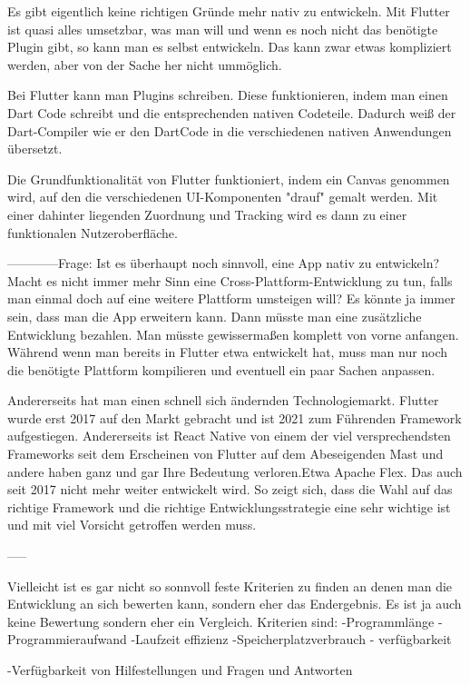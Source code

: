 Es gibt eigentlich keine richtigen Gründe mehr nativ zu entwickeln. Mit Flutter ist quasi alles umsetzbar, was man will und wenn es noch nicht das benötigte Plugin gibt, so kann man es selbst entwickeln. Das kann zwar etwas kompliziert werden, aber von der Sache her nicht ummöglich.

Bei Flutter kann man Plugins schreiben. Diese funktionieren, indem man einen Dart Code schreibt und die entsprechenden nativen Codeteile. Dadurch weiß der Dart-Compiler wie er den DartCode in die verschiedenen nativen Anwendungen übersetzt.

Die Grundfunktionalität von Flutter funktioniert, indem ein Canvas genommen wird, auf den die verschiedenen UI-Komponenten "drauf" gemalt werden. Mit einer dahinter liegenden Zuordnung und Tracking wird es dann zu einer funktionalen Nutzeroberfläche.

------------Frage: Ist es überhaupt noch sinnvoll, eine App nativ zu entwickeln? Macht es nicht immer mehr Sinn eine Cross-Plattform-Entwicklung zu tun, falls man einmal doch auf eine weitere Plattform umsteigen will? 
Es könnte ja immer sein, dass man die App erweitern kann. Dann müsste man eine zusätzliche Entwicklung bezahlen. Man müsste gewissermaßen komplett von vorne anfangen. Während wenn man bereits in Flutter etwa entwickelt hat, muss man nur noch die benötigte Plattform kompilieren und eventuell ein paar Sachen anpassen. 

Andererseits hat man einen schnell sich ändernden Technologiemarkt. Flutter wurde erst 2017 auf den Markt gebracht und ist 2021 zum Führenden Framework aufgestiegen. Andererseits ist React Native von einem der viel versprechendsten Frameworks seit dem Erscheinen von Flutter auf dem Abeseigenden Mast und andere haben ganz und gar Ihre Bedeutung verloren.Etwa Apache Flex. Das auch seit 2017 nicht mehr weiter entwickelt wird. So zeigt sich, dass die Wahl auf das richtige Framework und die richtige Entwicklungsstrategie eine sehr wichtige ist und mit viel Vorsicht getroffen werden muss.

-----

Vielleicht ist es gar nicht so sonnvoll feste Kriterien zu finden an denen man die Entwicklung an sich bewerten kann, sondern eher das Endergebnis. Es ist ja auch keine Bewertung sondern eher ein Vergleich.
Kriterien sind:
-Programmlänge
-Programmieraufwand
-Laufzeit effizienz
-Speicherplatzverbrauch
- verfügbarkeit

-Verfügbarkeit von Hilfestellungen und Fragen und Antworten

